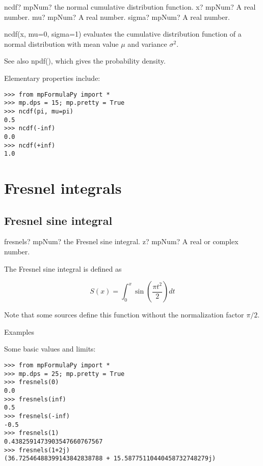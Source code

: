 \begin{mpFunctionsExtract}
	\mpFunctionThree
	{ncdf? mpNum? the normal cumulative distribution function.}
	{x? mpNum? A real number.}
	{mu? mpNum? A real number.}
	{sigma? mpNum? A real number.}
\end{mpFunctionsExtract}

\vpara
ncdf(x, mu=0, sigma=1) evaluates the cumulative distribution function of a normal distribution with mean value $\mu$ and variance $\sigma^2$.

See also npdf(), which gives the probability density.

Elementary properties include:


\begin{lstlisting}
>>> from mpFormulaPy import *
>>> mp.dps = 15; mp.pretty = True
>>> ncdf(pi, mu=pi)
0.5
>>> ncdf(-inf)
0.0
>>> ncdf(+inf)
1.0
\end{lstlisting}


\newpage
\section{Fresnel integrals}

\subsection{Fresnel sine integral}

\begin{mpFunctionsExtract}
	\mpFunctionOne
	{fresnels? mpNum? the Fresnel sine integral.}
	{z? mpNum? A real or complex number.}
\end{mpFunctionsExtract}


The Fresnel sine integral is defined as

\begin{equation}
S(x) = \int_0^x \sin\left(\frac{\pi t^2}{2}  \right) dt
\end{equation}

Note that some sources define this function without the normalization factor $\pi/2$.

\vpara
Examples

Some basic values and limits:

\begin{lstlisting}
>>> from mpFormulaPy import *
>>> mp.dps = 25; mp.pretty = True
>>> fresnels(0)
0.0
>>> fresnels(inf)
0.5
>>> fresnels(-inf)
-0.5
>>> fresnels(1)
0.4382591473903547660767567
>>> fresnels(1+2j)
(36.72546488399143842838788 + 15.58775110440458732748279j)
\end{lstlisting}


